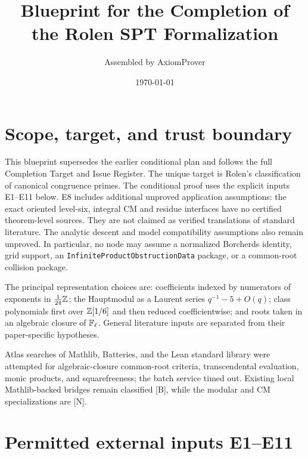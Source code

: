 \documentclass[11pt,a4paper]{article}
\title{Blueprint for the Completion of the Rolen SPT Formalization}\author{Assembled by AxiomProver}\date{\today}
\numberwithin{equation}{section}
\theoremstyle{plain}\newtheorem{theorem}{Theorem}[section]\newaliascnt{proposition}{theorem}\newtheorem{proposition}[proposition]{Proposition}\aliascntresetthe{proposition}\newaliascnt{lemma}{theorem}\newtheorem{lemma}[lemma]{Lemma}\aliascntresetthe{lemma}
\theoremstyle{definition}\newaliascnt{definition}{theorem}\newtheorem{definition}[definition]{Definition}\aliascntresetthe{definition}\newaliascnt{notation}{theorem}\newtheorem{notation}[notation]{Notation}\aliascntresetthe{notation}
\begin{document}
\maketitle

\section{Scope, target, and trust boundary}
This blueprint supersedes the earlier conditional plan and follows the full Completion Target and Issue Register.  The unique target is Rolen's classification of canonical congruence primes.  The conditional proof uses the explicit inputs E1--E11 below. E8 includes additional unproved application assumptions: the exact oriented level-six, integral CM and residue interfaces have no certified theorem-level sources. They are not claimed as verified translations of standard literature. The analytic descent and model compatibility assumptions also remain unproved.  In particular, no node may assume a normalized Borcherds identity, grid support, an \texttt{InfiniteProductObstructionData} package, or a common-root collision package.

The principal representation choices are: coefficients indexed by numerators of exponents in $\frac1{24}\mathbb Z$; the Hauptmodul as a Laurent series $q^{-1}-5+O(q)$; class polynomials first over $\mathbb Z[1/6]$ and then reduced coefficientwise; and roots taken in an algebraic closure of $\mathbb F_\ell$.  General literature inputs are separated from their paper-specific hypotheses.

Atlas searches of Mathlib, Batteries, and the Lean standard library were attempted for algebraic-closure common-root criteria, transcendental evaluation, monic products, and squarefreeness; the batch service timed out.  Existing local Mathlib-backed bridges remain classified [B], while the modular and CM specializations are [N].

\section{Permitted external inputs E1--E11}
\end{document}
